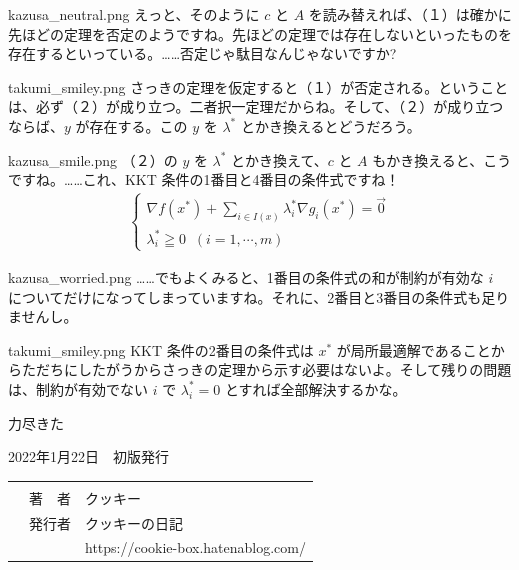 \documentclass[b5paper,xelatex,ja=standard,10pt]{bxjsarticle}
\begin{document}
\begin{SERIFU}[colback=PaleIris, colbacktitle=PaleIris2]{kazusa_neutral.png}
えっと、そのように $c$ と $A$ を読み替えれば、（１）は確かに先ほどの定理を否定のようですね。先ほどの定理では存在しないといったものを存在するといっている。……否定じゃ駄目なんじゃないですか?
\end{SERIFU}

\begin{SERIFU}[colback=PaleGold, colbacktitle=PaleGold2]{takumi_smiley.png}
さっきの定理を仮定すると（１）が否定される。ということは、必ず（２）が成り立つ。二者択一定理だからね。そして、（２）が成り立つならば、$y$ が存在する。この $y$ を $\lambda^\ast$ とかき換えるとどうだろう。
\end{SERIFU}

\begin{SERIFU}[colback=PaleIris, colbacktitle=PaleIris2]{kazusa_smile.png}
（２）の $y$ を $\lambda^\ast$ とかき換えて、$c$ と $A$ もかき換えると、こうですね。……これ、KKT 条件の1番目と4番目の条件式ですね！
\begin{eqnarray*}
\left\{
\begin{array}{l}
\displaystyle \nabla f (x^\ast) + \sum_{i \in I(x)} \lambda^\ast_i \nabla g_i (x^\ast) = \vec{0} \\[5pt]
\lambda^\ast_i \geqq 0 \; \; (i = 1, \cdots, m)
\end{array}
\right.
\end{eqnarray*}
\end{SERIFU}

\begin{SERIFU}[colback=PaleIris, colbacktitle=PaleIris2]{kazusa_worried.png}
……でもよくみると、1番目の条件式の和が制約が有効な $i$ についてだけになってしまっていますね。それに、2番目と3番目の条件式も足りませんし。
\end{SERIFU}

\begin{SERIFU}[colback=PaleGold, colbacktitle=PaleGold2]{takumi_smiley.png}
KKT 条件の2番目の条件式は $x^\ast$ が局所最適解であることからただちにしたがうからさっきの定理から示す必要はないよ。そして残りの問題は、制約が有効でない $i$ で $\lambda_i^\ast = 0$ とすれば全部解決するかな。
\end{SERIFU}

\vspace{5pt}
\noindent 力尽きた


\clearpage
\vspace*{16.7cm}

\begin{OKUDUKE}[title={\textbf{\large KKT条件の話}}]
2022年1月22日　初版発行 \\
{
\renewcommand\arraystretch{0.9}
\begin{tabular}{p{4cm}rp{5.9cm}}
 &  &  \\
 & 著　者 & クッキー \\
 & 発行者 & クッキーの日記 \\
 & & https://cookie-box.hatenablog.com/ 
\end{tabular}
}
\end{OKUDUKE}
\thispagestyle{empty}
\end{document}
